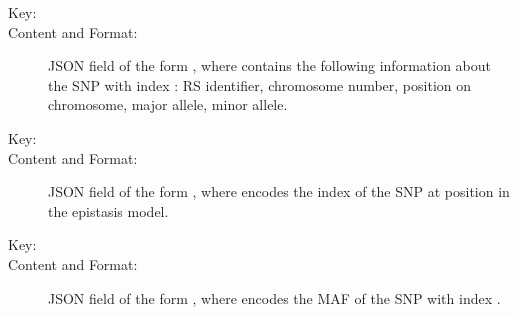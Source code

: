 \documentclass[a4paper,10pt,english]{sphinxhowto}
\begin{document}
\begin{description}
\begin{description}
\begin{description}
\end{description}

\item[{\sphinxcode{\sphinxupquote{\textless{}SNP\_DATA\textgreater{}}}}] \leavevmode\begin{description}
\item[{Key:}] \leavevmode
{}

\item[{Content and Format:}] \leavevmode
JSON field of the form , where  contains the following
information about the SNP with index : RS identifier, chromosome number, position on chromosome, major allele, minor allele.

\end{description}

\item[{\sphinxcode{\sphinxupquote{\textless{}DISEASE\_SNP\_DATA\textgreater{}}}}] \leavevmode\begin{description}
\item[{Key:}] \leavevmode
{}

\item[{Content and Format:}] \leavevmode
JSON field of the form , where  encodes the index of the SNP at position 
in the epistasis model.

\end{description}

\item[{\sphinxcode{\sphinxupquote{\textless{}MAF\_DATA\textgreater{}}}}] \leavevmode\begin{description}
\item[{Key:}] \leavevmode
{}

\item[{Content and Format:}] \leavevmode
JSON field of the form , where  encodes the MAF of
the SNP with index .

\end{description}

\end{description}

\end{description}
\end{document}
